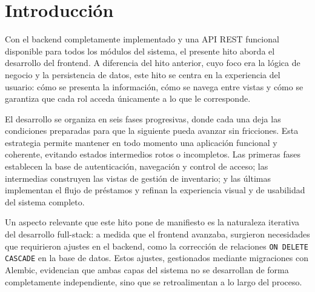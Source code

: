\section{Introducción}

Con el backend completamente implementado y una API REST funcional disponible para 
todos los módulos del sistema, el presente hito aborda el desarrollo del frontend. 
A diferencia del hito anterior, cuyo foco era la lógica de negocio y la persistencia 
de datos, este hito se centra en la experiencia del usuario: cómo se presenta la 
información, cómo se navega entre vistas y cómo se garantiza que cada rol acceda 
únicamente a lo que le corresponde.

El desarrollo se organiza en seis fases progresivas, donde cada una deja las 
condiciones preparadas para que la siguiente pueda avanzar sin fricciones. Esta 
estrategia permite mantener en todo momento una aplicación funcional y coherente, 
evitando estados intermedios rotos o incompletos. Las primeras fases establecen 
la base de autenticación, navegación y control de acceso; las intermedias 
construyen las vistas de gestión de inventario; y las últimas implementan el flujo 
de préstamos y refinan la experiencia visual y de usabilidad del sistema completo.

Un aspecto relevante que este hito pone de manifiesto es la naturaleza iterativa 
del desarrollo full-stack: a medida que el frontend avanzaba, surgieron necesidades 
que requirieron ajustes en el backend, como la corrección de relaciones 
\texttt{ON DELETE CASCADE} en la base de datos. Estos ajustes, gestionados mediante 
migraciones con Alembic, evidencian que ambas capas del sistema no se desarrollan 
de forma completamente independiente, sino que se retroalimentan a lo largo del 
proceso.